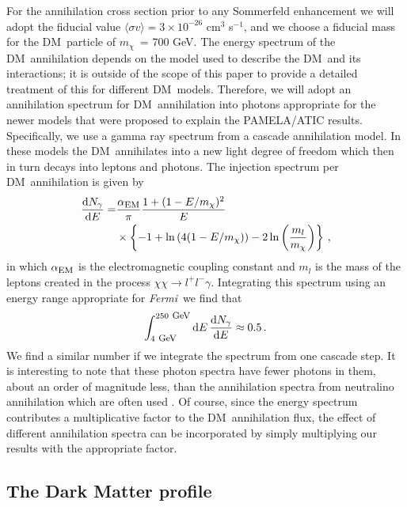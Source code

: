 \documentclass[aps,prd,twocolumn,amsmath,amssymb,floatfix,nofootinbib,10pt]{revtex4}
\newcommand{\Fermi}{\emph{Fermi}}
\newcommand{\DM}{DM}
\newcommand{\mdm}{\ensuremath{m_{\chi}}}
\newcommand{\dd}{\mathrm{d}}
\newcommand{\Ngamma}{\ensuremath{N_{\gamma}}}
\newcommand{\sigmaannv}{\ensuremath{\langle\sigma v\rangle}}
\begin{document}
For the annihilation cross section prior to any Sommerfeld enhancement
we will adopt the fiducial value $\sigmaannv = 3 \times 10^{-26} $
cm$^3$ s$^{-1}$, and we choose a fiducial mass for the \DM\ particle
of \mdm\ = 700 GeV. The energy spectrum of the \DM\ annihilation
depends on the model used to describe the \DM\ and its interactions;
it is outside of the scope of this paper to provide a detailed
treatment of this for different \DM\ models. Therefore, we will adopt
an annihilation spectrum for \DM\ annihilation into photons
appropriate for the newer models that were proposed to explain the
PAMELA/ATIC results. Specifically, we use a gamma ray spectrum from a
cascade annihilation model. In these models the \DM\ annihilates into
a new light degree of freedom which then in turn decays into leptons
and photons. The injection spectrum per \DM\ annihilation is given by
\cite{2009arXiv0901.2926M}
\begin{equation}\label{eq:annspectrum}
\begin{split}
\frac{\dd \Ngamma}{\dd E} = &\frac{\alpha_{\mbox{{\footnotesize EM}}}}{\pi} \frac{1+(1-E/\mdm)^2}{E}\\
&\times\left\{-1 + \ln\left(4(1-E/\mdm)\right) -2\ln\left(\frac{m_l}{\mdm}\right)\right\}\, ,
\end{split}
\end{equation}
in which $\alpha_{\mbox{{\footnotesize EM}}}$ is the electromagnetic
coupling constant and $m_l$ is the mass of the leptons created in the
process $\chi\chi \rightarrow l^+l^-\gamma$. Integrating this spectrum
using an energy range appropriate for \Fermi\ we find that
\begin{equation} 
\int_{4 \mbox{ {\footnotesize GeV}}}^{250 \mbox{ {\footnotesize GeV}}}\dd E\, \frac{\dd
\Ngamma}{\dd E} \approx 0.5\, .
\end{equation}
We find a similar number if we integrate the spectrum from one
cascade step. It is interesting to note that these photon spectra have
fewer photons in them, about an order of magnitude less, than the
annihilation spectra from neutralino annihilation which are often
used \cite{1998APh.....9..137B,2004PhRvD..70j3529F}. Of course, since
the energy spectrum contributes a multiplicative factor to the \DM\
annihilation flux, the effect of different annihilation spectra can be
incorporated by simply multiplying our results with the appropriate
factor.




\subsection{The Dark Matter profile}\label{sec:DMprofile}
\end{document}
